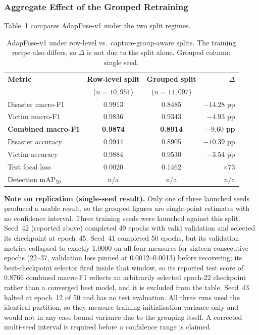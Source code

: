 \documentclass[journal]{IEEEtran}
\begin{document}
\subsubsection{Aggregate Effect of the Grouped Retraining}

Table~\ref{tab:grouped_comparison} compares AdapFuse-v1 under the two split regimes.

\begin{table}[!t]
\centering
\caption[Row-level vs.\ capture-group-aware split]{AdapFuse-v1 under row-level vs.\ capture-group-aware splits. The training recipe also differs, so $\Delta$ is not due to the split alone. Grouped column: single seed.}
\label{tab:grouped_comparison}
\begin{tabular}{@{}lccr@{}}
\toprule
\textbf{Metric} & \textbf{Row-level split} & \textbf{Grouped split} & \textbf{$\Delta$} \\
                & ($n=10{,}951$)          & ($n=11{,}097$)         &                    \\
\midrule
Disaster macro-F1   & 0.9913 & 0.8485 & $-14.28$ pp \\
Victim macro-F1     & 0.9836 & 0.9343 & $-4.93$ pp \\
\textbf{Combined macro-F1} & \textbf{0.9874} & \textbf{0.8914} & $\mathbf{-9.60}$ \textbf{pp} \\
Disaster accuracy   & 0.9944 & 0.8905 & $-10.39$ pp \\
Victim accuracy     & 0.9884 & 0.9530 & $-3.54$ pp \\
Test focal loss     & 0.0020 & 0.1462 & $\times 73$ \\
Detection $\mathrm{mAP}_{50}$ & n/a & n/a & n/a \\
\bottomrule
\end{tabular}

\vspace{2mm}
\parbox{\textwidth}{\footnotesize \textbf{Note on replication (single-seed result).} Only one of three launched seeds produced a usable result, so the grouped figures are single-point estimates with no confidence interval. Three training seeds were launched against this split. Seed~42 (reported above) completed 49 epochs with valid validation and selected its checkpoint at epoch~45. Seed~41 completed 50 epochs, but its validation metrics collapsed to exactly 1.0000 on all four measures for sixteen consecutive epochs (22--37, validation loss pinned at 0.0012--0.0013) before recovering; its best-checkpoint selector fired inside that window, so its reported test score of 0.8766 combined macro-F1 reflects an arbitrarily selected epoch-22 checkpoint rather than a converged best model, and it is excluded from the table. Seed~43 halted at epoch~12 of 50 and has no test evaluation. All three runs used the identical partition, so they measure training-initialisation variance only and would not in any case bound variance due to the grouping itself. A corrected multi-seed interval is required before a confidence range is claimed.}
\end{table}
\end{document}
